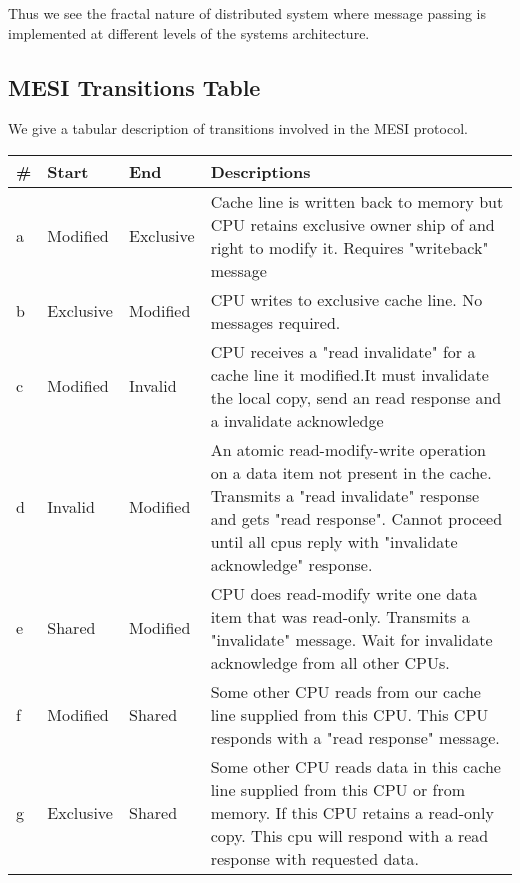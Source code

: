 \documentclass{article}
\begin{document}
Thus we see the fractal nature of distributed system where message
passing is implemented at different levels of the systems
architecture.


\subsection{MESI Transitions Table}

We give a tabular description of transitions involved in the MESI
protocol.



\begin{tabular} {| l | l | l | p{9cm}| }    
    \hline
    \# & Start  & End   & Descriptions \\
    \hline
    a & Modified  & Exclusive &
    Cache line is written back to memory but CPU retains exclusive 
    owner ship of and right to modify it. Requires "writeback" 
    message\\
    \hline
    b& Exclusive & Modified &  
    CPU writes to exclusive cache line. No messages required. \\
    \hline
    c & Modified & Invalid &   
    CPU receives a "read invalidate" for a cache line it modified.It 
    must invalidate the local copy, send an read response and a 
    invalidate acknowledge \\
    \hline
    d & Invalid & Modified &
    An atomic read-modify-write operation on a data item not present
    in the cache. Transmits a "read invalidate" response and gets
    "read response". Cannot proceed until all cpus reply with
    "invalidate acknowledge" response.    \\

    \hline
    e & Shared & Modified & 

    CPU does read-modify write one data item that was
    read-only. Transmits a "invalidate" message. Wait for invalidate
    acknowledge from all other CPUs.    
    \\
    \hline
    f & Modified & Shared &

    Some other CPU reads from our cache line supplied from this
    CPU. This CPU responds with a "read response" message.    
    \\    
    \hline

    g & Exclusive & Shared & 


    Some other CPU reads data in this cache line supplied from this
    CPU or from memory. If this CPU retains a read-only copy. This cpu
    will respond with a read response with requested data.
    

\end{tabular}
\end{document}
